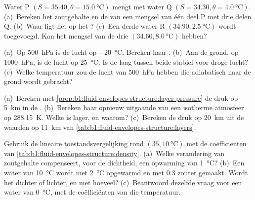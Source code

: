 \begin{exercise}[$\star$]\label{exo:b1:fluid-envelopes-structure:4}
Water P $(S = 35.40, \theta = \qty{15.0}{\celsius})$ mengt met water Q $(S =
34.30, \theta = \qty{4.0}{\celsius})$. (a)~Bereken het zoutgehalte en de  van een mengsel van één deel P met drie delen Q.
(b)~Waar ligt het op het ? (c)~Een derde water R $(34.90,
\qty{2.5}{\celsius})$ wordt toegevoegd. Kan het mengsel van de drie $(34.60, \qty{8.0}{\celsius})$ hebben?
\end{exercise}

\begin{exercise}[$\star\star$]\label{exo:b1:fluid-envelopes-structure:5}
(a)~Op \qty{500}{hPa} is de lucht op \qty{-20}{\celsius}. Bereken haar . (b)~Aan de grond, op \qty{1000}{hPa}, is de lucht op \qty{25}{\celsius}. Is de laag tussen beide stabiel voor droge lucht? (c)~Welke temperatuur zou de lucht van \qty{500}{hPa} hebben die adiabatisch naar de grond wordt gebracht?
\end{exercise}

\begin{exercise}[$\star\star$]\label{exo:b1:fluid-envelopes-structure:6}
(a)~Bereken met \cref{prop:b1:fluid-envelopes-structure:layer-pressure} de druk op \qty{5}{km} in de . (b)~Bereken haar opnieuw uitgaande van een isotherme atmosfeer op \qty{288.15}{K}. Welke is lager, en waarom? (c)~Bereken de druk op \qty{20}{km} uit de waarden op \qty{11}{km} van \cref{tab:b1:fluid-envelopes-structure:layers}.
\end{exercise}

\begin{exercise}[$\star\star$]\label{exo:b1:fluid-envelopes-structure:7}
Gebruik de lineaire toestandsvergelijking rond $(35, \qty{10}{\celsius})$ met de coëfficiënten van \cref{tab:b1:fluid-envelopes-structure:density}. (a)~Welke verandering van zoutgehalte compenseert, voor de dichtheid, een opwarming van \qty{1}{\celsius}? (b)~Een water van \qty{10}{\celsius} wordt met \qty{2}{\celsius} opgewarmd en met \num{0.3} zouter gemaakt. Wordt het dichter of lichter, en met hoeveel? (c)~Beantwoord dezelfde vraag voor een water van \qty{0}{\celsius}, met de coëfficiënten van die temperatuur.
\end{exercise}

